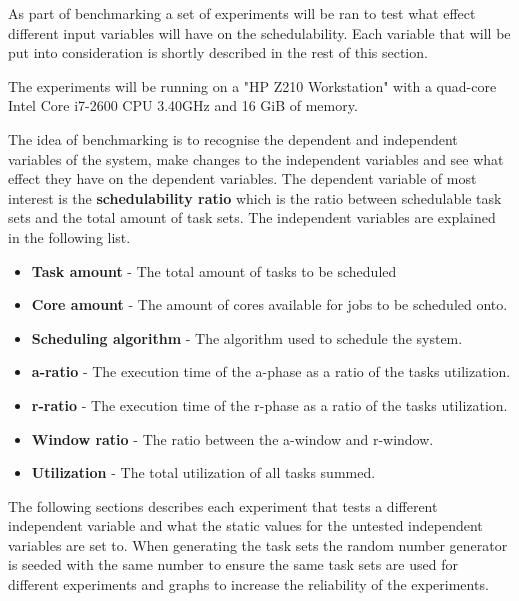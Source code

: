 \documentclass{kththesis}
\begin{document}
As part of benchmarking a set of experiments will be ran to test what effect different input
variables will have on the schedulability. Each variable that will be put into consideration is
shortly described in the rest of this section.

The experiments will be running on a "HP Z210 Workstation" with a quad-core Intel Core i7-2600 CPU
\@3.40GHz and 16 GiB of memory.

The idea of benchmarking is to recognise the dependent and independent variables of the system, make
changes to the independent variables and see what effect they have on the dependent variables. The
dependent variable of most interest is the \textbf{schedulability ratio} which is the ratio between
schedulable task sets and the total amount of task sets. The independent variables are explained in
the following list.

\begin{itemize}

    \item \textbf{Task amount} - The total amount of tasks to be scheduled
    \item \textbf{Core amount} - The amount of cores available for jobs to be scheduled onto.
    \item \textbf{Scheduling algorithm} - The algorithm used to schedule the system. 
    \item \textbf{\acrshort{a}-ratio} - The execution time of the \acrshort{a}-phase as a ratio of
        the tasks utilization.
    \item \textbf{\acrshort{r}-ratio} - The execution time of the \acrshort{r}-phase as a ratio of
        the tasks utilization.
    \item \textbf{Window ratio} - The ratio between the \acrshort{a}-window and \acrshort{r}-window.
    \item \textbf{Utilization} - The total utilization of all tasks summed.

\end{itemize}


The following sections describes each experiment that tests a different independent variable and
what the static values for the untested independent variables are set to. When generating the task
sets the random number generator is seeded with the same number to ensure the same task sets are
used for different experiments and graphs to increase the reliability of the experiments. 
\end{document}
